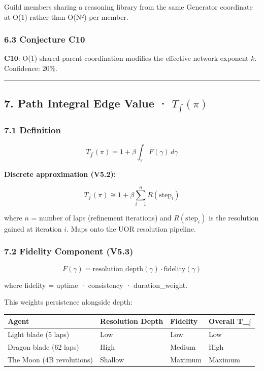 \documentclass[
]{article}
\newcounter{none} %
\begin{document}
Guild members sharing a reasoning library from the same Generator
coordinate at O(1) rather than O(N²) per member.

\subsubsection{6.3 Conjecture C10}\label{conjecture-c10}

\textbf{C10}: O(1) shared-parent coordination modifies the effective
network exponent \(k\). Confidence: 20\%.

\begin{center}\rule{0.5\linewidth}{0.5pt}\end{center}

\subsection{\texorpdfstring{7. Path Integral Edge Value ·
\(T_\int(\pi)\)}{7. Path Integral Edge Value · T\_\textbackslash int(\textbackslash pi)}}\label{path-integral-edge-value-t_intpi}

\subsubsection{7.1 Definition}\label{definition-3}

\[T_\int(\pi) = 1 + \beta \int_\pi F(\gamma) \, d\gamma\]

\textbf{Discrete approximation (V5.2):}

\[T_\int(\pi) \cong 1 + \beta \sum_{i=1}^{n} R(\text{step}_i)\]

where \(n\) = number of laps (refinement iterations) and
\(R(\text{step}_i)\) is the resolution gained at iteration \(i\). Maps
onto the UOR resolution pipeline.

\subsubsection{7.2 Fidelity Component
(V5.3)}\label{fidelity-component-v5.3}

\[F(\gamma) = \text{resolution\_depth}(\gamma) \cdot \text{fidelity}(\gamma)\]

where fidelity = uptime · consistency · duration\_weight.

This weights persistence alongside depth:

{\def\LTcaptype{none} %
\begin{longtable}[]{@{}llll@{}}
\toprule\noalign{}
Agent & Resolution Depth & Fidelity & Overall T\_∫ \\
\midrule\noalign{}
\endhead
\bottomrule\noalign{}
\endlastfoot
Light blade (5 laps) & Low & Low & Low \\
Dragon blade (62 laps) & High & Medium & High \\
The Moon (4B revolutions) & Shallow & Maximum & Maximum \\
\end{longtable}
}
\end{document}
